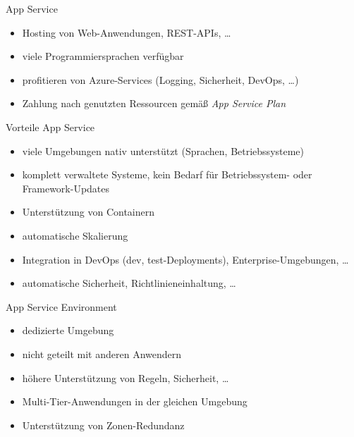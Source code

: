 \begin{flashcard}[]{App Service}
  \begin{itemize}
    \item Hosting von Web-Anwendungen, REST-APIs, \ldots
    \item viele Programmiersprachen verfügbar
    \item profitieren von Azure-Services (Logging, Sicherheit, DevOps, \ldots)
    \item Zahlung nach genutzten Ressourcen gemäß \emph{App Service Plan}
  \end{itemize}
\end{flashcard}

\begin{flashcard}[]{Vorteile App Service}
  \begin{itemize}
    \item viele Umgebungen nativ unterstützt (Sprachen, Betriebssysteme)
    \item komplett verwaltete Systeme, kein Bedarf für Betriebssystem- oder Framework-Updates
    \item Unterstützung von Containern
    \item automatische Skalierung
    \item Integration in DevOps (dev, test-Deployments), Enterprise-Umgebungen, \ldots
    \item automatische Sicherheit, Richtlinieneinhaltung, \ldots
  \end{itemize}
\end{flashcard}

\begin{flashcard}[]{App Service Environment}
  \begin{itemize}
    \item dedizierte Umgebung
    \item nicht geteilt mit anderen Anwendern
    \item höhere Unterstützung von Regeln, Sicherheit, \ldots
    \item Multi-Tier-Anwendungen in der gleichen Umgebung
    \item Unterstützung von Zonen-Redundanz
  \end{itemize}
\end{flashcard}

